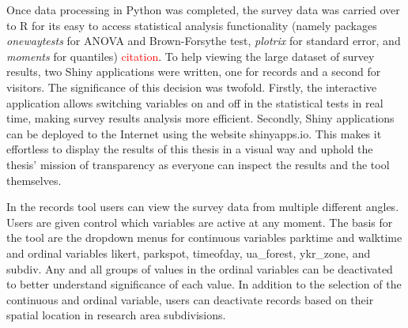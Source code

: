 \justify
Once data processing in Python was completed, the survey data was carried over to R for its easy to access statistical analysis functionality (namely packages \textit{onewaytests} for ANOVA and Brown-Forsythe test, \textit{plotrix} for standard error, and \textit{moments} for quantiles) \textcolor{red}{citation}. To help viewing the large dataset of survey results, two Shiny applications were written, one for records and a second for visitors. The significance of this decision was twofold. Firstly, the interactive application allows switching variables on and off in the statistical tests in real time, making survey results analysis more efficient. Secondly, Shiny applications can be deployed to the Internet using the website shinyapps.io. This makes it effortless to display the results of this thesis in a visual way and uphold the thesis' mission of transparency as everyone can inspect the results and the tool themselves.

In the records tool users can view the survey data from multiple different angles. Users are given control which variables are active at any moment. The basis for the tool are the dropdown menus for continuous variables parktime and walktime and ordinal variables likert, parkspot, timeofday, ua\_forest, ykr\_zone, and subdiv. Any and all groups of values in the ordinal variables can be deactivated to better understand significance of each value. In addition to the selection of the continuous and ordinal variable, users can deactivate records based on their spatial location in research area subdivisions.

